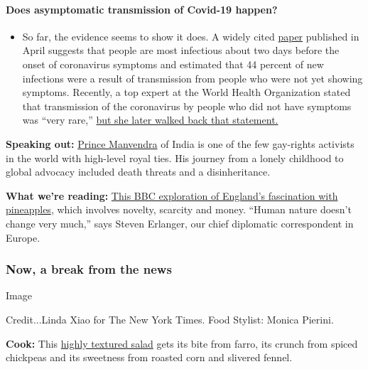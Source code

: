\begin{itemize}
{  \paragraph{Does asymptomatic transmission of Covid-19
  happen?}\label{does-asymptomatic-transmission-of-covid-19-happen}}

  \begin{itemize}
  \tightlist
  \item
    So far, the evidence seems to show it does. A widely cited
    \href{https://www.nature.com/articles/s41591-020-0869-5}{paper}
    published in April suggests that people are most infectious about
    two days before the onset of coronavirus symptoms and estimated that
    44 percent of new infections were a result of transmission from
    people who were not yet showing symptoms. Recently, a top expert at
    the World Health Organization stated that transmission of the
    coronavirus by people who did not have symptoms was ``very rare,''
    \href{https://www.nytimes.com/2020/06/09/world/coronavirus-updates.html?action=click\&pgtype=Article\&state=default\&region=MAIN_CONTENT_3\&context=storylines_faq\#link-1f302e21}{but
    she later walked back that statement.}
  \end{itemize}
\end{itemize}

\textbf{Speaking out:}
\href{https://www.nytimes.com/2020/07/31/world/asia/india-prince-manvendra-gay-rights.html}{Prince
Manvendra} of India is one of the few gay-rights activists in the world
with high-level royal ties. His journey from a lonely childhood to
global advocacy included death threats and a disinheritance.

\textbf{What we're reading:}
\href{https://www.bbc.com/news/uk-england-53432877}{This BBC exploration
of England's fascination with pineapples}, which involves novelty,
scarcity and money. ``Human nature doesn't change very much,'' says
Steven Erlanger, our chief diplomatic correspondent in Europe.

\hypertarget{now-a-break-from-the-news}{%
\subsubsection{Now, a break from the
news}\label{now-a-break-from-the-news}}

Image

Credit...Linda Xiao for The New York Times. Food Stylist: Monica
Pierini.

\textbf{Cook:} This
\href{https://www.nytimes.com/2020/07/31/dining/farro-corn-chickpea-salad-recipe.html}{highly
textured salad} gets its bite from farro, its crunch from spiced
chickpeas and its sweetness from roasted corn and slivered fennel.

